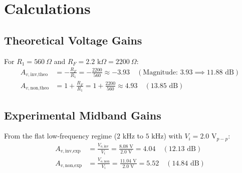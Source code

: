 \documentclass[12pt,a4paper]{article}
\begin{document}
\section{Calculations}

\subsection{Theoretical Voltage Gains}
For $R_1 = 560\ \Omega$ and $R_F = 2.2\text{ k}\Omega = 2200\ \Omega$:
\begin{align}
    A_{v,\text{inv,theo}} &= -\frac{R_F}{R_1} = -\frac{2200}{560} \approx -3.93 \quad (\text{Magnitude: } 3.93 \implies 11.88\text{ dB}) \\
    A_{v,\text{non,theo}} &= 1 + \frac{R_F}{R_1} = 1 + \frac{2200}{560} \approx 4.93 \quad (13.85\text{ dB})
\end{align}

\subsection{Experimental Midband Gains}
From the flat low-frequency regime ($2\text{ kHz}$ to $5\text{ kHz}$) with $V_i = 2.0\text{ V}_{p-p}$:
\begin{align}
    A_{v,\text{inv,exp}} &= \frac{V_{o,\text{inv}}}{V_i} = \frac{8.08\text{ V}}{2.0\text{ V}} = 4.04 \quad (12.13\text{ dB}) \\
    A_{v,\text{non,exp}} &= \frac{V_{o,\text{non}}}{V_i} = \frac{11.04\text{ V}}{2.0\text{ V}} = 5.52 \quad (14.84\text{ dB})
\end{align}
\end{document}
